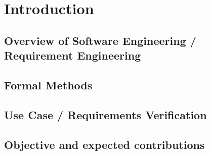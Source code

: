 \chapter{Introduction}

\section{Overview of Software Engineering / Requirement Engineering}

\section{Formal Methods}

\section{Use Case / Requirements Verification}

\section{Objective and expected contributions}
